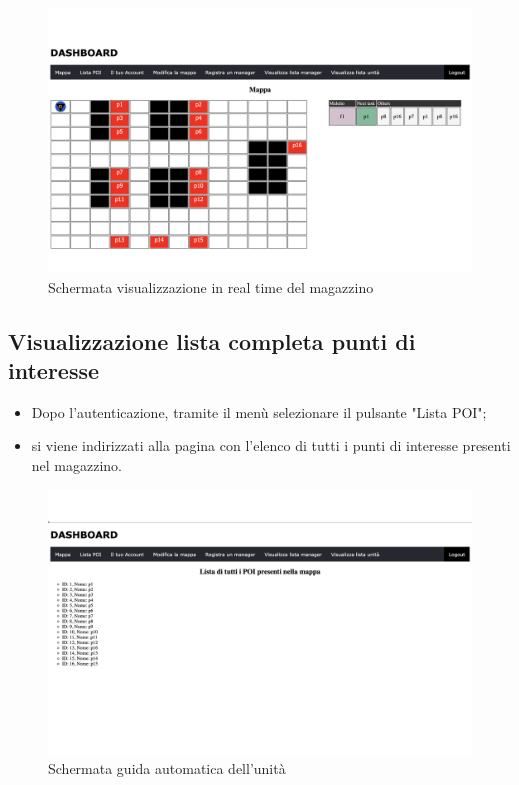 \begin{figure}[H]
    \centering
    \includegraphics[scale=0.12]{res/images/map_user.png}
    \caption{Schermata visualizzazione in real time del magazzino}
\end{figure}

\subsection{Visualizzazione lista completa punti di interesse}
\begin{itemize}
    \item Dopo l'autenticazione, tramite il menù selezionare il pulsante "Lista POI";
    \item si viene indirizzati alla pagina con l'elenco di tutti i punti di interesse presenti nel magazzino.

\end{itemize}

\begin{figure}[H]
    \centering
    \includegraphics[scale=0.12]{res/images/listpoi_user.png}
    \caption{Schermata guida automatica dell'unità}
\end{figure}

